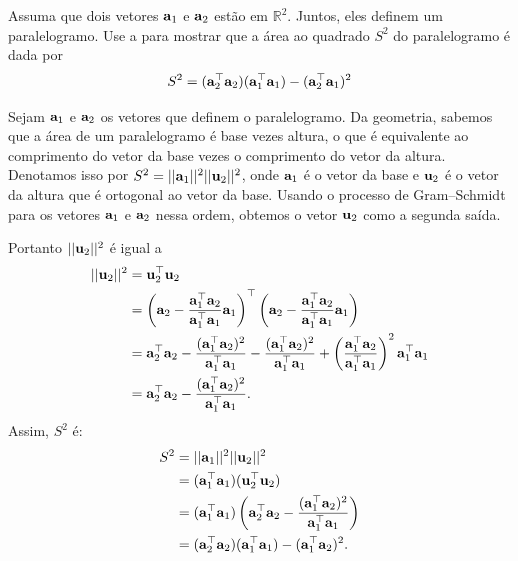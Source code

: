 \label{ex:linear-transforms}

\begin{exenumerate}
    \item Assuma que dois vetores $ \mathbf{a}_1$ e $\mathbf{a}_2$ est\~ao em $\mathbb{R}^2$. Juntos,
    eles definem um paralelogramo. Use a  para mostrar que a
    \'area ao quadrado $S^2$ do paralelogramo \'e dada por
    \begin{equation}
        S^2 = (\mathbf{a}_2^\top\mathbf{a}_2)(\mathbf{a}_1^\top\mathbf{a}_1)-(\mathbf{a}_2^\top\mathbf{a}_1)^2
    \end{equation}
    
    \begin{solution}
        Sejam $\mathbf{a}_1$ e $\mathbf{a}_2$ os vetores que definem o paralelogramo. Da geometria,
        sabemos que a \'area de um paralelogramo \'e base vezes altura, o que \'e
        equivalente ao comprimento do vetor da base vezes o comprimento do vetor da altura.
        Denotamos isso por $S^2 = ||\mathbf{a}_1||^2||\mathbf{u}_2||^2$, onde $\mathbf{a}_1$ \'e o vetor da base
        e $\mathbf{u}_2$ \'e o vetor da altura que \'e ortogonal ao vetor da base. Usando o processo de
        Gram--Schmidt para os vetores $\mathbf{a}_1$ e $\mathbf{a}_2$ nessa
        ordem, obtemos o vetor $\mathbf{u}_2$ como a segunda sa\'ida.
        \begin{figure}[h!]
            \centering
            \scalebox{0.75}{
                 }
        \end{figure}
        
        Portanto $||\mathbf{u}_2||^2$ \'e igual a
        \begin{align}
            ||\mathbf{u}_2||^2 &= \mathbf{u}_2^\top\mathbf{u}_2 \\
            &= \left(\mathbf{a}_2 - \frac{\mathbf{a}_1^\top\mathbf{a}_2}{\mathbf{a}_1^\top\mathbf{a}_1}\mathbf{a}_1\right)^\top\left(\mathbf{a}_2 - \frac{\mathbf{a}_1^\top\mathbf{a}_2}{\mathbf{a}_1^\top\mathbf{a}_1}\mathbf{a}_1\right) \\
            &= \mathbf{a}_2^\top\mathbf{a}_2 - \frac{(\mathbf{a}_1^\top\mathbf{a}_2)^2}{\mathbf{a}_1^\top\mathbf{a}_1} - \frac{(\mathbf{a}_1^\top\mathbf{a}_2)^2}{\mathbf{a}_1^\top\mathbf{a}_1} + \left(\frac{\mathbf{a}_1^\top\mathbf{a}_2}{\mathbf{a}_1^\top\mathbf{a}_1}\right)^2\mathbf{a}_1^\top\mathbf{a}_1 \\
            &= \mathbf{a}_2^\top\mathbf{a}_2 - \frac{(\mathbf{a}_1^\top\mathbf{a}_2)^2}{\mathbf{a}_1^\top\mathbf{a}_1}.
        \end{align}
        Assim, $S^2$ \'e:
        \begin{align}
            S^2 &= ||\mathbf{a}_1||^2||\mathbf{u}_2||^2 \\
            &= (\mathbf{a}_1^\top\mathbf{a}_1)(\mathbf{u}_2^\top\mathbf{u}_2) \\
            &= (\mathbf{a}_1^\top\mathbf{a}_1)\left(\mathbf{a}_2^\top\mathbf{a}_2 - \frac{(\mathbf{a}_1^\top\mathbf{a}_2)^2}{\mathbf{a}_1^\top\mathbf{a}_1}\right) \\
            &= (\mathbf{a}_2^\top\mathbf{a}_2)(\mathbf{a}_1^\top\mathbf{a}_1) - (\mathbf{a}_1^\top\mathbf{a}_2)^2.
        \end{align}
        

\end{solution}
\end{exenumerate}
